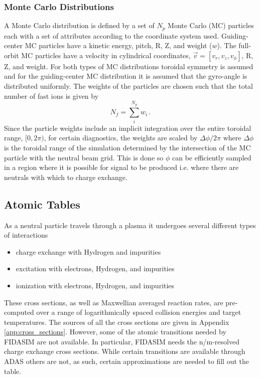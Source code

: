 \subsubsection{Monte Carlo Distributions}
A Monte Carlo distribution is defined by a set of $N_p$ Monte Carlo (MC) particles each with a set of attributes according to the coordinate system used. Guiding-center MC particles have a kinetic energy, pitch, R, Z, and weight ($w$). The full-orbit MC particles have a velocity in cylindrical coordinates, $\vec{v} = [v_r,v_z,v_\phi]$, R, Z, and weight.
For both types of MC distributions toroidal symmetry is assumed and for the guiding-center MC distribution it is assumed that the gyro-angle is distributed uniformly.
The weights of the particles are chosen such that the total number of fast ions is given by
\begin{equation}\label{eq:mc_ntot}
    N_{f} = \sum_i^{N_{p}} w_i \,.
\end{equation}
Since the particle weights include an implicit integration over the entire toroidal range, $[0,2\pi)$, for certain diagnostics, the weights are scaled by $\Delta \phi/2\pi$ where $\Delta \phi$ is the toroidal range of the simulation determined by the intersection of the MC particle with the neutral beam grid. This is done so $\phi$ can be efficiently sampled in a region where it is possible for signal to be produced i.e. where there are neutrals with which to charge exchange.

\subsection{Atomic Tables}
As a neutral particle travels through a plasma it undergoes several different types of interactions
\begin{itemize}
    \item charge exchange with Hydrogen and impurities
    \item excitation with electrons, Hydrogen, and impurities
    \item ionization with electrons, Hydrogen, and impurities
\end{itemize}
These cross sections, as well as Maxwellian averaged reaction rates, are pre-computed over a range of logarithmically spaced collision energies and target temperatures. The sources of all the cross sections are given in Appendix \ref{app:cross_sections}. 
However, some of the atomic transitions needed by FIDASIM are not available. In particular, FIDASIM needs the n/m-resolved charge exchange cross sections. While certain transitions are available through ADAS\cite{adas} others are not, as such, certain approximations are needed to fill out the table.

